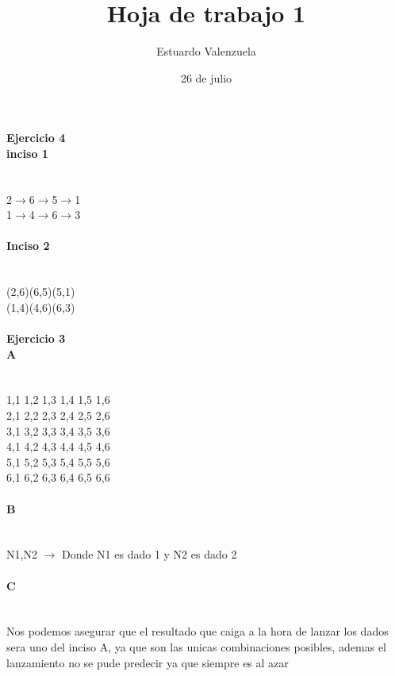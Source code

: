 \documentclass{article}
\begin{document}
\title{Hoja de trabajo 1}
\author{Estuardo Valenzuela}
\date{26 de julio}
\maketitle
\paragraph{Ejercicio 4 \ \\ inciso 1}
\ \\ 2$\rightarrow$6$\rightarrow$5$\rightarrow$1
\ \\
1$\rightarrow$4$\rightarrow$6$\rightarrow$3
\ \\ \paragraph{Inciso 2}
\ \\ 
(2,6)(6,5)(5,1)
\ \\
(1,4)(4,6)(6,3)
\ \\ \paragraph{Ejercicio 3 \ \\ A}
\ \\ 1,1 1,2 1,3 1,4 1,5 1,6
\ \\ 2,1 2,2 2,3 2,4 2,5 2,6
\ \\ 3,1 3,2 3,3 3,4 3,5 3,6
\ \\ 4,1 4,2 4,3 4,4 4,5 4,6
\ \\ 5,1 5,2 5,3 5,4 5,5 5,6
\ \\ 6,1 6,2 6,3 6,4 6,5 6,6
\ \\ \paragraph{B}
\ \\ N1,N2 $\rightarrow$  Donde N1 es dado 1 y N2 es dado 2
\ \\ \paragraph{C}
\ \\ Nos podemos asegurar que el resultado que caiga a la hora de lanzar los dados sera uno del inciso A, ya que son las unicas combinaciones posibles, ademas el lanzamiento no se pude predecir ya que siempre es al azar 
\end{document}
